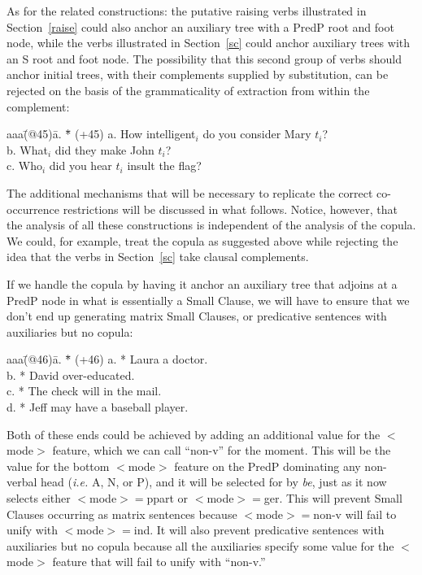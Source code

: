 As for the related constructions: the putative raising verbs illustrated
in Section~\ref{raise} could also anchor an auxiliary tree with a PredP
root and foot node, while the verbs illustrated in Section~\ref{sc}
could anchor auxiliary trees with an S root and foot node.  The
possibility that this second group of verbs should anchor initial trees,
with their complements supplied by substitution, can be rejected on the
basis of the grammaticality of extraction from within the complement:
\begin{tabbing}
aaa\=(@45)\= a. \= *\= \kill
   \>(+45)\> a. \>  \>How intelligent$_{i}$ do you consider Mary $t_{i}$?  \\
   \>  \>    b. \>  \>What$_{i}$ did they make John $t_{i}$? \\
   \>  \>    c. \>  \>Who$_{i}$ did you hear $t_{i}$ insult the flag?
\end{tabbing}
The additional mechanisms that will be necessary to replicate the
correct co-occurrence restrictions will be discussed in what follows.
Notice, however, that the analysis of all these constructions is
independent of the analysis of the copula.  We could, for example, treat
the copula as suggested above while rejecting the idea that the verbs in
Section~\ref{sc} take clausal complements.

If we handle the copula by having it anchor an auxiliary tree that
adjoins at a PredP node in what is essentially a Small Clause, we will
have to ensure that we don't end up generating matrix Small Clauses, or
predicative sentences with auxiliaries but no copula:
\begin{tabbing}
aaa\=(@46)\= a. \= *\= \kill
   \>(+46)\> a. \> *\> Laura a doctor. \\
   \>     \> b. \> *\> David over-educated. \\
   \>     \> c. \> *\> The check will in the mail. \\
   \>     \> d. \> *\> Jeff may have a baseball player.
\end{tabbing}
Both of these ends could be achieved by adding an additional value for
the $<$mode$>$ feature, which we can call ``non-v'' for the moment. This
will be the value for the bottom $<$mode$>$ feature on the PredP
dominating any non-verbal head ({\em i.e.\/} A, N, or P), and it will be
selected for by {\em be\/}, just as it now selects either $<$mode$>=$ppart
or $<$mode$>=$ger. This will prevent Small Clauses occurring as matrix
sentences because $<$mode$>=$non-v will fail to unify with
$<$mode$>=$ind.  It will also prevent predicative sentences with
auxiliaries but no copula because all the auxiliaries specify some value
for the $<$mode$>$ feature that will fail to unify with ``non-v.''


